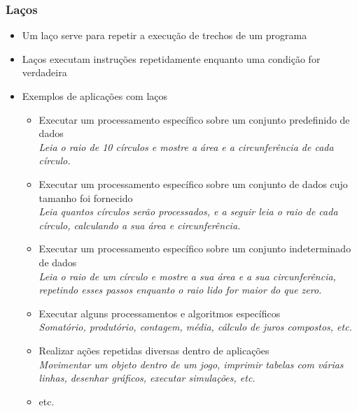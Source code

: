 \documentclass[xcolor={dvipsnames,table},aspectratio=169]{beamer}
\begin{document}
\begin{frame}[fragile]\frametitle{Laços}
\begin{itemize}
	\item Um laço serve para repetir a execução de trechos de um programa\\
	\item Laços executam instruções repetidamente enquanto uma condição for verdadeira\\
	\item Exemplos de aplicações com laços\\
	\begin{itemize}
		\item Executar um processamento específico sobre um conjunto predefinido de dados\\\emph{\tiny Leia o raio de 10 círculos e mostre a área e a circunferência de cada círculo.}\\
		\item Executar um processamento específico sobre um conjunto de dados cujo tamanho foi fornecido\\\emph{\tiny Leia quantos círculos serão processados, e a seguir leia o raio de cada círculo, calculando a sua área e circunferência.}\\
		\item Executar um processamento específico sobre um conjunto indeterminado de dados\\\emph{\tiny Leia o raio de um círculo e mostre a sua área e a sua circunferência, repetindo esses passos enquanto o raio lido for maior do que zero.}\\
		\item Executar alguns processamentos e algoritmos específicos\\\emph{\tiny Somatório, produtório, contagem, média, cálculo de juros compostos, etc.}\\
		\item Realizar ações repetidas diversas dentro de aplicações\\\emph{\tiny Movimentar um objeto dentro de um jogo, imprimir tabelas com várias linhas, desenhar gráficos, executar simulações, etc.}\\
		\item etc.\\	
	\end{itemize}
\end{itemize}
\end{frame}
\end{document}
